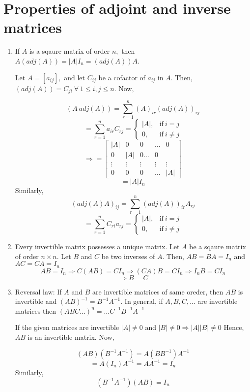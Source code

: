 \section{Properties of adjoint and inverse matrices}
\begin{enumerate}
\item If $A$ is a sqaure matrix of order $n,$ then $A(adj(A)) = |A|I_n = (adj(A))A$.

Let $A= [a_{ij}],$ and let $C_{ij}$ be a cofactor of $a_{ij}$ in $A$. Then, $(adj(A)) = C_{ji}~\forall~1\leq i, j\leq n$. Now,

\[(A~adj(A)) = \sum_{r = 1}^n (A)_{ir}(adj(A))_{rj}\]
\[= \sum_{r = 1}^n a_{ir}C_{rj} = \begin{cases} |A|, & \text{if}~i = j \\ 0, & \text{if}~i \neq j\end{cases}\]
\[\Rightarrow = \begin{bmatrix} |A| & 0 & 0 & \ldots & 0 \\ 0 & |A| & 0
   \ldots & 0 \\ \vdots & \vdots & \vdots & \vdots & \vdots \\ 0 & 0 & 0 &
   \ldots & |A|\end{bmatrix}\]
\[= |A|I_n\]
Similarly, \[(adj(A) A)_{ij} = \sum_{r = 1}^n (adj(A))_{ir}A_{rj}\]
\[= \sum_{r = 1}^n C_{ri}a_{rj}= \begin{cases} |A|, & \text{if}~i = j
   \\ 0, & \text{if}~i \neq j\end{cases}\]

\item Every invertible matrix possesses a unique matrix. Let $A$ be a sqaure matrix of order $n\times n$. Let $B$ and $C$ be two
inverses of $A$. Then, $AB = BA = I_n$ and $AC = CA = I_n$
\[AB = I_n\Rightarrow C(AB) = CI_n\Rightarrow (CA)B=CI_n\Rightarrow I_nB = CI_n\]
\[\Rightarrow B = C\]

\item  Reversal law: If $A$ and $B$ are invertible matrices of same oreder, then $AB$ is invertible and $(AB)^{-1} = B^{-1}A^{-1}.$
In general, if $A,B, C, ...$ are invertible matrices then $(ABC\ldots)^n = \ldots C^{-1}B^{-1}A^{-1}$

If the given matrices are invertible $|A|\neq 0$ and $|B|\neq 0 \Rightarrow |A||B|\neq 0$ Hence, $AB$ is an invertible matrix. Now,

\[(AB)(B^{-1}A^{-1}) = A(BB^{-1})A^{-1}\]
\[= A(I_n)A^{-1} = AA^{-1} = I_n\]
Similarly, \[(B^{-1}A^{-1})(AB) = I_n\]


\end{enumerate}
